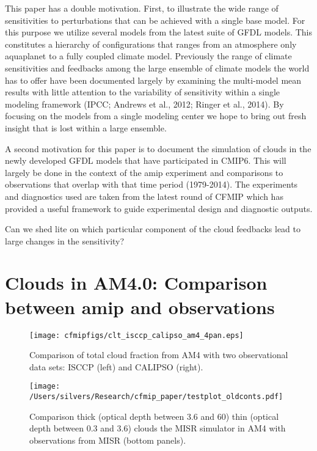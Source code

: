 \documentclass[11pt]{article}   	%
\begin{document}
This paper has a double motivation.  First, to illustrate the wide range of sensitivities to perturbations 
that can be achieved with a single base model.  For this purpose we utilize several models from the latest suite of GFDL 
models.  This constitutes a hierarchy of configurations that ranges from an atmosphere only aquaplanet to a fully coupled 
climate model.  Previously the range of climate sensitivities and feedbacks among the large ensemble of climate models 
the world has to offer have been documented largely by examining the multi-model mean results with little attention to 
the variability of sensitivity within a single modeling framework (IPCC; Andrews et al., 2012; Ringer et al., 2014).  By 
focusing on the models from a single modeling center we hope to bring out fresh insight that is lost within a large ensemble.

A second motivation for this paper is to document the simulation of clouds in the newly developed GFDL models that 
have participated in CMIP6.  This will largely be done in the context of the amip experiment and comparisons to observations
that overlap with that time period (1979-2014).  The experiments and diagnostics used are taken from the latest 
round of CFMIP which has provided a useful framework to guide experimental design and diagnostic outputs.       

Can we shed lite on which particular component of the cloud feedbacks lead to large changes in the sensitivity?  

\section{Clouds in AM4.0: Comparison between amip and observations}

\begin{figure}
  \texttt{[image: cfmipfigs/clt\_isccp\_calipso\_am4\_4pan.eps]}
  \caption{Comparison of total cloud fraction from AM4 with two observational data sets: ISCCP (left) and CALIPSO (right).}
  \label{fig:clt_isccp_calipso}
\end{figure}

\begin{figure}
  \texttt{[image: /Users/silvers/Research/cfmip\_paper/testplot\_oldconts.pdf]}
  \caption{Comparison thick (optical depth between 3.6 and 60) thin (optical depth between 0.3 and 3.6) clouds the 
  MISR simulator in  AM4 with observations from MISR (bottom panels).}
  \label{fig:misr}
\end{figure}
\end{document}
